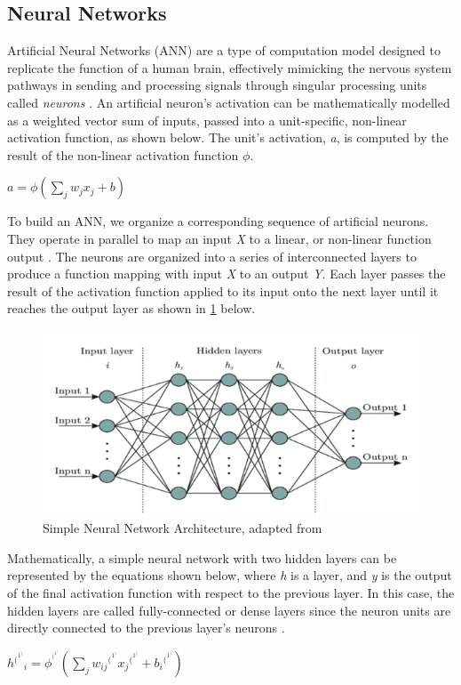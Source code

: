\documentclass{article}
\begin{document}
\subsection{Neural Networks}
Artificial Neural Networks (ANN) are a type of computation model designed to replicate the function of a human brain, effectively mimicking the nervous system pathways in sending and processing signals through singular processing units called \emph{neurons} \cite{gurney1997introduction}. An artificial neuron’s activation can be mathematically modelled as a weighted vector sum of inputs, passed into a unit-specific, non-linear activation function, as shown below. The unit’s activation, \emph{a}, is computed by the result of the non-linear activation function $\phi$.
\newline
\newline
\centerline{$a = \phi(\sum_{j} w_{j}x_{j} + b)$ \cite{grosse2019lecture03}}
\newline

To build an ANN, we organize a corresponding sequence of artificial neurons. They operate in parallel to map an input \emph{X} to a linear, or non-linear function output \cite{https://doi.org/10.1002/cpe.6767,seger2018investigation}. The neurons are organized into a series of interconnected layers to produce a function mapping with input \emph{X} to an output \emph{Y}. Each layer passes the result of the activation function applied to its input onto the next layer until it reaches the output layer as shown in \ref{fig:my_label} below.

\begin{figure}[h!]
    \centering
    \includegraphics[scale=0.75]{NN_figure.png}
    \caption{Simple Neural Network Architecture, adapted from \cite{https://doi.org/10.1002/cpe.6767}}
    \label{fig:my_label}
\end{figure}


Mathematically, a simple neural network with two hidden layers can be represented by the equations shown below, where \emph{h} is a layer, and \emph{y} is the output of the final activation function with respect to the previous layer. In this case, the hidden layers are called fully-connected or dense layers since the neuron units are directly connected to the previous layer’s neurons \cite{grosse2019lecture03}.
\newline
\newline
\centerline{$h{^(^1^)}_{i} = \phi^{^(^1^)}(\sum_{j} w_{ij}{^(^1^)}x_j{^(^1^)} + b_i{^(^1^)})$}
\end{document}
